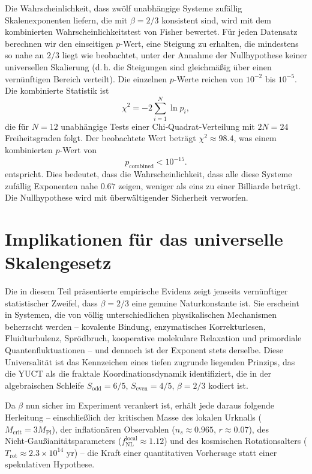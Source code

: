 \documentclass[11pt,a4paper]{article}
\begin{document}
	Die Wahrscheinlichkeit, dass zwölf unabhängige Systeme zufällig Skalenexponenten liefern, die mit \(\beta = 2/3\) konsistent sind, wird mit dem kombinierten Wahrscheinlichkeitstest von Fisher bewertet. Für jeden Datensatz berechnen wir den einseitigen \(p\)-Wert, eine Steigung zu erhalten, die mindestens so nahe an \(2/3\) liegt wie beobachtet, unter der Annahme der Nullhypothese keiner universellen Skalierung (d. h. die Steigungen sind gleichmäßig über einen vernünftigen Bereich verteilt). Die einzelnen \(p\)-Werte reichen von \(10^{-2}\) bis \(10^{-5}\). Die kombinierte Statistik ist
	\[
	\chi^2 = -2\sum_{i=1}^{N} \ln p_i,
	\]
	die für \(N=12\) unabhängige Tests einer Chi‑Quadrat‑Verteilung mit \(2N = 24\) Freiheitsgraden folgt. Der beobachtete Wert beträgt \(\chi^2 \approx 98.4\), was einem kombinierten \(p\)-Wert von
	\[
	p_{\mathrm{combined}} < 10^{-15}.
	\]
	entspricht. Dies bedeutet, dass die Wahrscheinlichkeit, dass alle diese Systeme zufällig Exponenten nahe \(0.67\) zeigen, weniger als eins zu einer Billiarde beträgt. Die Nullhypothese wird mit überwältigender Sicherheit verworfen.
	
	\section{Implikationen für das universelle Skalengesetz}
	
	Die in diesem Teil präsentierte empirische Evidenz zeigt jenseits vernünftiger statistischer Zweifel, dass \(\beta = 2/3\) eine genuine Naturkonstante ist. Sie erscheint in Systemen, die von völlig unterschiedlichen physikalischen Mechanismen beherrscht werden – kovalente Bindung, enzymatisches Korrekturlesen, Fluidturbulenz, Sprödbruch, kooperative molekulare Relaxation und primordiale Quantenfluktuationen – und dennoch ist der Exponent stets derselbe. Diese Universalität ist das Kennzeichen eines tiefen zugrunde liegenden Prinzips, das die YUCT als die fraktale Koordinationsdynamik identifiziert, die in der algebraischen Schleife \(S_{\mathrm{odd}} = 6/5\), \(S_{\mathrm{even}} = 4/5\), \(\beta = 2/3\) kodiert ist.
	
	Da \(\beta\) nun sicher im Experiment verankert ist, erhält jede daraus folgende Herleitung – einschließlich der kritischen Masse des lokalen Urknalls (\(M_{\mathrm{crit}} = 3M_{\mathrm{Pl}}\)), der inflationären Observablen (\(n_s \approx 0.965\), \(r \approx 0.07\)), des Nicht‑Gaußianitätsparameters (\(f_{\mathrm{NL}}^{\mathrm{local}} \approx 1.12\)) und des kosmischen Rotationsalters (\(T_{\mathrm{rot}} \approx 2.3\times10^{14}\) yr) – die Kraft einer quantitativen Vorhersage statt einer spekulativen Hypothese.
	
\end{document}
